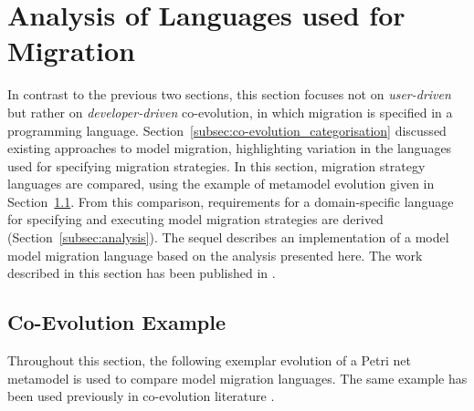 
\section{Analysis of Languages used for Migration}
\label{sec:analyis_of_languages_used_for_migration}
In contrast to the previous two sections, this section focuses not on \emph{user-driven} but rather on \emph{developer-driven} co-evolution, in which migration is specified in a programming language. Section~\ref{subsec:co-evolution_categorisation} discussed existing approaches to model migration, highlighting variation in the languages used for specifying migration strategies. In this section, migration strategy languages are compared, using the example of metamodel evolution given in Section~\ref{subsec:co-evo_example}. From this comparison, requirements for a domain-specific language for specifying and executing model migration strategies are derived (Section~\ref{subsec:analysis}). The sequel describes an implementation of a model model migration language based on the analysis presented here. The work described in this section has been published in \cite{rose10flock}.

\subsection{Co-Evolution Example}
\label{subsec:co-evo_example}
Throughout this section, the following exemplar evolution of a Petri net metamodel is used to compare model migration languages. The same example has been used previously in co-evolution literature \cite{cicchetti08automating,garces09managing,wachsmuth07metamodel}.

